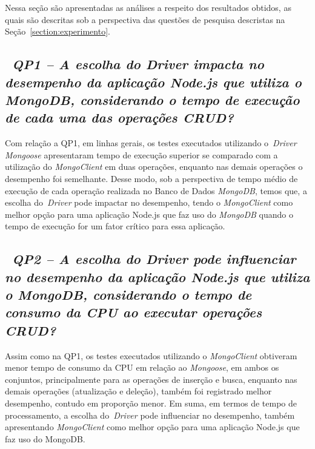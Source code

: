 \documentclass{svproc}
\begin{document}
Nessa seção são apresentadas as análises a respeito dos resultados obtidos, as quais são descritas sob a perspectiva das questões de pesquisa descristas na Seção~\ref{section:experimento}.

\subsection{~\emph{QP1 -- A escolha do Driver impacta no desempenho da aplicação Node.js que utiliza o MongoDB, considerando o tempo de execução de cada uma das operações CRUD?}}
\label{q1}

Com relação a QP1, em linhas gerais, os testes executados utilizando o~\emph{Driver} \emph{Mongoose} apresentaram tempo de execução superior se comparado com a utilização do \emph{MongoClient} em duas operações, enquanto nas demais operações o desempenho foi semelhante.
Desse modo, sob a perspectiva de tempo médio de execução de cada operação realizada no Banco de Dados \emph{MongoDB}, temos que, a escolha do~\emph{Driver} pode impactar no desempenho, tendo o \emph{MongoClient} como melhor opção para uma aplicação Node.js que faz uso do \emph{MongoDB} quando o tempo de execução for um fator crítico para essa aplicação.

\subsection{~\emph{QP2 -- A escolha do Driver pode influenciar no desempenho da aplicação Node.js que utiliza o MongoDB, considerando o tempo de consumo da CPU ao executar operações CRUD?}}
\label{q2}

Assim como na QP1, os testes executados utilizando o \emph{MongoClient} obtiveram menor tempo de consumo da CPU em relação ao \emph{Mongoose}, em ambos os conjuntos, principalmente para as operações de inserção e busca, enquanto nas demais operações (atualização e deleção), também foi registrado melhor desempenho, contudo em proporção menor.
Em suma, em termos de tempo de processamento, a escolha do~\emph{Driver} pode influenciar no desempenho, também apresentando \emph{MongoClient} como melhor opção para uma aplicação Node.js que faz uso do MongoDB.
\end{document}
